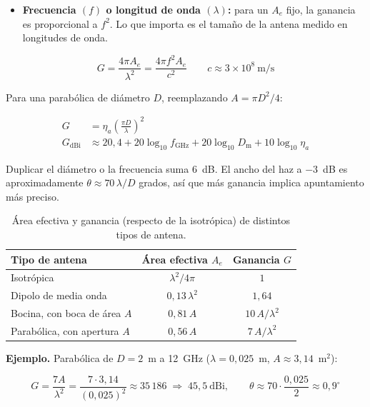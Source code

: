 \documentclass[11pt,a4paper]{article}
\begin{document}
\begin{enumerate}[label=4.\arabic*), itemsep=0.3cm]
\begin{itemize}
  \item \textbf{Frecuencia $(f)$ o longitud de onda $(\lambda)$:} para un $A_e$ fijo, la ganancia es proporcional a $f^2$. Lo que importa es el tamaño de la antena medido en longitudes de onda.
\end{itemize}

\[
  \boxed{
    G = \frac{4\pi A_e}{\lambda^2}
      = \frac{4\pi f^2 A_e}{c^2}
  }
  \qquad c \approx 3 \times 10^8~\text{m/s}
\]

Para una parabólica de diámetro $D$, reemplazando $A = \pi D^2/4$:

\begin{align*}
  G &= \eta_a \left(\frac{\pi D}{\lambda}\right)^2 \\
  G_{\text{dBi}} &\approx 20{,}4 + 20\log_{10} f_{\text{GHz}} + 20\log_{10} D_{\text{m}} + 10\log_{10}\eta_a
\end{align*}

Duplicar el diámetro o la frecuencia suma 6~dB. El ancho del haz a $-3$~dB es aproximadamente $\theta \approx 70\,\lambda/D$ grados, así que más ganancia implica apuntamiento más preciso.

\begin{table}[h]
\centering
\begin{tabular}{lcc}
\toprule
\textbf{Tipo de antena} & \textbf{Área efectiva $A_e$} & \textbf{Ganancia $G$} \\
\midrule
Isotrópica                     & $\lambda^2/4\pi$    & $1$ \\
Dipolo de media onda           & $0{,}13\,\lambda^2$ & $1{,}64$ \\
Bocina, con boca de área $A$   & $0{,}81\,A$         & $10\,A/\lambda^2$ \\
Parabólica, con apertura $A$   & $0{,}56\,A$         & $7\,A/\lambda^2$ \\
\bottomrule
\end{tabular}
\caption{Área efectiva y ganancia (respecto de la isotrópica) de distintos tipos de antena.}
\end{table}

\textbf{Ejemplo.} Parabólica de $D = 2$~m a 12~GHz ($\lambda = 0{,}025$~m, $A \approx 3{,}14$~m$^2$):

\[
  G = \frac{7A}{\lambda^2} = \frac{7 \cdot 3{,}14}{(0{,}025)^2} \approx 35\,186
  \;\Longrightarrow\; 45{,}5~\text{dBi},
  \qquad \theta \approx 70 \cdot \frac{0{,}025}{2} \approx 0{,}9^\circ
\]


\end{enumerate}
\end{document}
